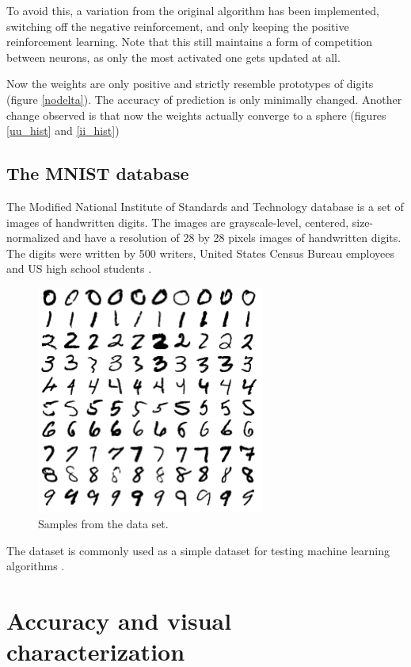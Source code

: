 \documentclass[a4paper]{report}
\begin{document}
To avoid this, a variation from the original algorithm has been implemented, switching off the negative reinforcement, and only keeping the positive reinforcement learning.
Note that this still maintains a form of competition between neurons, as only the most activated one gets updated at all.

Now the weights are only positive and strictly resemble prototypes of digits (figure \ref{nodelta}).
The accuracy of prediction is only minimally changed.
Another change observed is that now the weights actually converge to a sphere (figures \ref{uu_hist} and \ref{ii_hist})

\section{The MNIST database}

The Modified National Institute of Standards and Technology database is a set of images of handwritten digits. The images are grayscale-level, centered, size-normalized and have a resolution of 28 by 28 pixels images of handwritten digits.
The digits were written by 500 writers, United States Census Bureau employees and US high school students  \cite{MNISTweb}.

\begin{figure} [H]
	\centering
	\includegraphics [width=7.5cm ] {o/mnist.png}
	\caption{Samples from the data set.}
	\label{mnist}
\end{figure}

The dataset is commonly used as a simple dataset for testing machine learning algorithms \cite{cohen2017emnist}.

\chapter{Accuracy and visual characterization}
\end{document}
